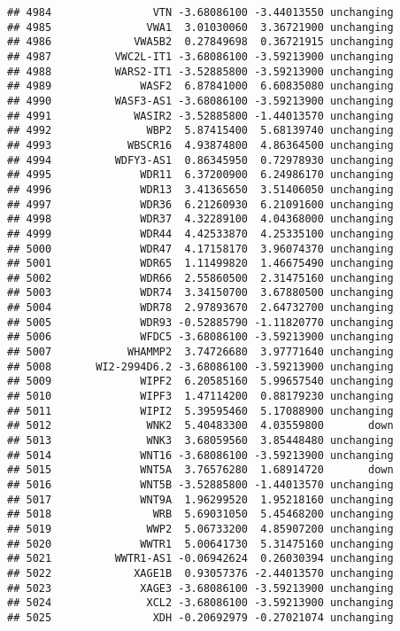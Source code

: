 \documentclass[]{article}
\begin{document}
\begin{verbatim}
## 4984                VTN -3.68086100 -3.44013550 unchanging
## 4985               VWA1  3.01030060  3.36721900 unchanging
## 4986             VWA5B2  0.27849698  0.36721915 unchanging
## 4987          VWC2L-IT1 -3.68086100 -3.59213900 unchanging
## 4988          WARS2-IT1 -3.52885800 -3.59213900 unchanging
## 4989              WASF2  6.87841000  6.60835080 unchanging
## 4990          WASF3-AS1 -3.68086100 -3.59213900 unchanging
## 4991             WASIR2 -3.52885800 -1.44013570 unchanging
## 4992               WBP2  5.87415400  5.68139740 unchanging
## 4993            WBSCR16  4.93874800  4.86364500 unchanging
## 4994          WDFY3-AS1  0.86345950  0.72978930 unchanging
## 4995              WDR11  6.37200900  6.24986170 unchanging
## 4996              WDR13  3.41365650  3.51406050 unchanging
## 4997              WDR36  6.21260930  6.21091600 unchanging
## 4998              WDR37  4.32289100  4.04368000 unchanging
## 4999              WDR44  4.42533870  4.25335100 unchanging
## 5000              WDR47  4.17158170  3.96074370 unchanging
## 5001              WDR65  1.11499820  1.46675490 unchanging
## 5002              WDR66  2.55860500  2.31475160 unchanging
## 5003              WDR74  3.34150700  3.67880500 unchanging
## 5004              WDR78  2.97893670  2.64732700 unchanging
## 5005              WDR93 -0.52885790 -1.11820770 unchanging
## 5006              WFDC5 -3.68086100 -3.59213900 unchanging
## 5007            WHAMMP2  3.74726680  3.97771640 unchanging
## 5008       WI2-2994D6.2 -3.68086100 -3.59213900 unchanging
## 5009              WIPF2  6.20585160  5.99657540 unchanging
## 5010              WIPF3  1.47114200  0.88179230 unchanging
## 5011              WIPI2  5.39595460  5.17088900 unchanging
## 5012               WNK2  5.40483300  4.03559800       down
## 5013               WNK3  3.68059560  3.85448480 unchanging
## 5014              WNT16 -3.68086100 -3.59213900 unchanging
## 5015              WNT5A  3.76576280  1.68914720       down
## 5016              WNT5B -3.52885800 -1.44013570 unchanging
## 5017              WNT9A  1.96299520  1.95218160 unchanging
## 5018                WRB  5.69031050  5.45468200 unchanging
## 5019               WWP2  5.06733200  4.85907200 unchanging
## 5020              WWTR1  5.00641730  5.31475160 unchanging
## 5021          WWTR1-AS1 -0.06942624  0.26030394 unchanging
## 5022             XAGE1B  0.93057376 -2.44013570 unchanging
## 5023              XAGE3 -3.68086100 -3.59213900 unchanging
## 5024               XCL2 -3.68086100 -3.59213900 unchanging
## 5025                XDH -0.20692979 -0.27021074 unchanging

\end{verbatim}
\end{document}

